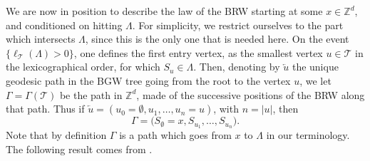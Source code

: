 \documentclass[JEP,XML,SOM,Unicode,NoFloatCountersInSection,published]{cedram}
\theoremstyle{plain}
\theoremstyle{definition}
\newcommand{\1}{{\text{\Large $\mathfrak 1$}}}
\begin{document}
We are now in position to describe the law of the BRW starting
at some $x\in \mathbb Z^d$, and
conditioned on hitting $\Lambda$.
For simplicity, we restrict ourselves to the part which intersects $\Lambda$,
since this is the only one that is needed here.
On the event $\{\ell_{\mathcal T}(\Lambda)>0\}$,
one defines the first entry vertex, as the smallest vertex
$u\in \mathcal T$ in the lexicographical order, for which $S_u\in \Lambda$.
Then, denoting by $\overleftarrow{u}$
the unique geodesic path in the BGW tree going from the root to
the vertex $u$, we let $\Gamma=\Gamma(\mathcal T)$
be the path in $\mathbb Z^d$,
made of the successive positions of the BRW along that path.
Thus if \hbox{$\overleftarrow{u} = (u_0=\emptyset, u_1,\dots,u_n=u)$},
with $n=|u|$, then
\[
\Gamma=\big(S_\emptyset=x,S_{u_1},\dots,S_{u_n}\big).
\]
Note that by definition $\Gamma$
is a path which goes from $x$ to $\Lambda$ in our terminology.
The following result comes from \cite[Prop.\,2.4]{Zhu3}.
\end{document}
